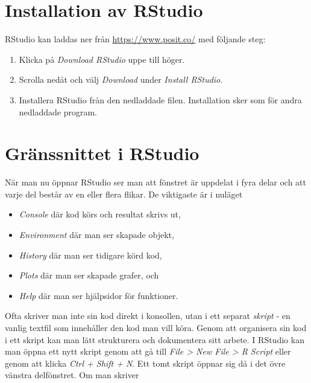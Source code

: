\documentclass[
]{book}
\providecommand{\tightlist}{%
  \setlength{\itemsep}{0pt}\setlength{\parskip}{0pt}}
\theoremstyle{definition}
\theoremstyle{definition}
\theoremstyle{definition}
\theoremstyle{definition}
\theoremstyle{remark}
\begin{document}
\hypertarget{installation-av-rstudio}{%
\section{Installation av RStudio}\label{installation-av-rstudio}}

RStudio kan laddas ner från \url{https://www.posit.co/} med följande steg:

\begin{enumerate}
\def\labelenumi{\arabic{enumi}.}
\tightlist
\item
  Klicka på \emph{Download RStudio} uppe till höger.
\item
  Scrolla nedåt och välj \emph{Download} under \emph{Install RStudio}.
\item
  Installera RStudio från den nedladdade filen. Installation sker som för andra nedladdade program.
\end{enumerate}

\hypertarget{gruxe4nssnittet-i-rstudio}{%
\section{Gränssnittet i RStudio}\label{gruxe4nssnittet-i-rstudio}}

När man nu öppnar RStudio ser man att fönstret är uppdelat i fyra delar och att varje del består av en eller flera flikar. De viktigaste är i nuläget

\begin{itemize}
\tightlist
\item
  \emph{Console} där kod körs och resultat skrivs ut,
\item
  \emph{Environment} där man ser skapade objekt,
\item
  \emph{History} där man ser tidigare körd kod,
\item
  \emph{Plots} där man ser skapade grafer, och
\item
  \emph{Help} där man ser hjälpsidor för funktioner.
\end{itemize}

Ofta skriver man inte sin kod direkt i konsollen, utan i ett separat \emph{skript} - en vanlig textfil som innehåller den kod man vill köra. Genom att organisera sin kod i ett skript kan man lätt strukturera och dokumentera sitt arbete. I RStudio kan man öppna ett nytt skript genom att gå till \emph{File \textgreater{} New File \textgreater{} R Script} eller genom att klicka \emph{Ctrl + Shift + N}. Ett tomt skript öppnar sig då i det övre vänstra delfönstret. Om man skriver
\end{document}
